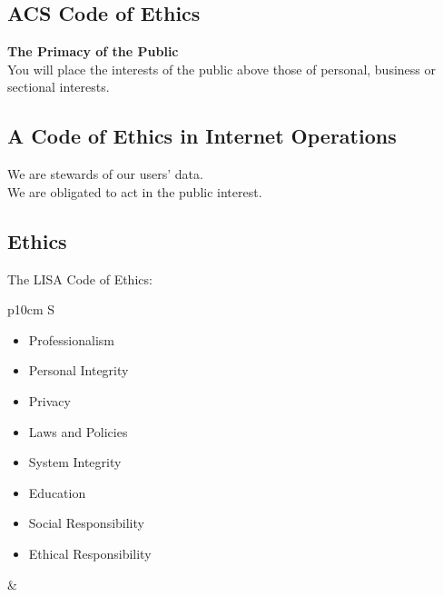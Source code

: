 \documentclass[xga]{xdvislides}
\begin{document}
\subsection{ACS Code of Ethics}
\Huge
\vspace*{\fill}
\begin{center}

{\bf The Primacy of the Public} \\
You will place the interests of the public
above those of personal, business or sectional
interests.

\end{center}
\vspace*{\fill}
\Normalsize

\subsection{A Code of Ethics in Internet Operations}
\Huge
\vspace*{\fill}
\begin{center}

We are stewards of our users' data. \\

We are obligated to act in the public interest.

\end{center}
\vspace*{\fill}
\Normalsize

\subsection{Ethics}
The LISA Code of Ethics:
\\

\begin{tabular}{ p{10cm} S }
\begin{itemize}
	\item Professionalism
	\item Personal Integrity
	\item Privacy
	\item Laws and Policies
	\item System Integrity
	\item Education
	\item Social Responsibility
	\item Ethical Responsibility
\end{itemize}
&  \\
\end{tabular}
\end{document}
